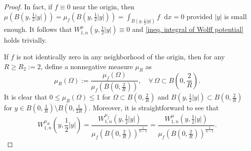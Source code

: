 \documentclass[12pt]{amsart}
\theoremstyle{plain}
\theoremstyle{definition}
\theoremstyle{remark}     %
\numberwithin{equation}{section}
\newcommand{\dx}{\mathop{}\!\mathrm{d}x}
\begin{document}
\begin{proof}
    In fact, if $f\equiv 0$ near the origin, then $\mu(B(y,\frac{1}{2}|y|))=\mu_f(B(y,\frac{1}{2}|y|))=\int_{B(y,\frac{1}{2}|y|)}f\dx=0$ provided $|y|$ is small enough. It follows that $W_{1,n}^{\mu}(y,\frac{1}{2}|y|)\equiv 0$ and \cref{ineq. integral of Wolff potential} holds trivially.
    
    If $f$ is not identically zero in any neighborhood of the origin, then for any $R\geq R_2:=2$, define a nonnegative measure $\mu_R$ as 
    \[
        \mu_R(\Omega):=\frac{\mu_f(\Omega)}{\mu_f(B(0,\frac{2}{R}))},\quad \forall \,\Omega\subset 
        B\left(0,\frac{2}{R}\right).
    \]
    It is clear that $0\leq\mu_R(\Omega)\leq 1$ for $\Omega\subset B(0,\frac{2}{R})$ and $B(y,\frac{1}{2}|y|)\subset B(0,\frac{2}{R})$ for $y\in B(0,\frac{1}{R})\setminus B(0,\frac{1}{2R})$. Moreover, it is straightforward to see that 
    \[
        W_{1,n}^{\mu_R}(y,\frac{1}{2}|y|)
        =\frac{W_{1,n}^{\mu_f}(y,\frac{1}{2}|y|)}{\mu_f(B(0,\frac{2}{R}))^{\frac{1}{n-1}}}
        =\frac{W_{1,n}^{\mu}(y,\frac{1}{2}|y|)}{\mu_f(B(0,\frac{2}{R}))^{\frac{1}{n-1}}}.
    \]


\end{proof}
\end{document}
